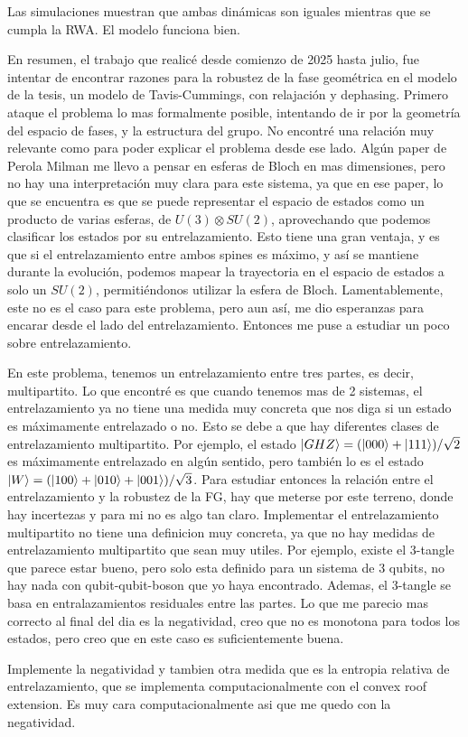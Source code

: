 Las simulaciones muestran que ambas dinámicas son iguales mientras que se cumpla la RWA. El modelo funciona bien.

En resumen, el trabajo que realicé desde comienzo de 2025 hasta julio, fue intentar de encontrar razones para la robustez de la fase geométrica en el modelo de la tesis, un modelo de Tavis-Cummings, con relajación y dephasing. Primero ataque el problema lo mas formalmente posible, intentando de ir por la geometría del espacio de fases, y la estructura del grupo. No encontré una relación muy relevante como para poder explicar el problema desde ese lado. Algún paper de Perola Milman me llevo a pensar en esferas de Bloch en mas dimensiones, pero no hay una interpretación muy clara para este sistema, ya que en ese paper, lo que se encuentra es que se puede representar el espacio de estados como un producto de varias esferas, de $U(3)\otimes SU(2)$, aprovechando que podemos clasificar los estados por su entrelazamiento. Esto tiene una gran ventaja, y es que si el entrelazamiento entre ambos spines es máximo, y así se mantiene durante la evolución, podemos mapear la trayectoria en el espacio de estados a solo un $SU(2)$, permitiéndonos utilizar la esfera de Bloch. Lamentablemente, este no es el caso para este problema, pero aun así, me dio esperanzas para encarar desde el lado del entrelazamiento. Entonces me puse a estudiar un poco sobre entrelazamiento. 

En este problema, tenemos un entrelazamiento entre tres partes, es decir, multipartito. Lo que encontré es que cuando tenemos mas de 2 sistemas, el entrelazamiento ya no tiene una medida muy concreta que nos diga si un estado es máximamente entrelazado o no. Esto se debe a que hay diferentes clases de entrelazamiento multipartito. Por ejemplo, el estado $\ket{GHZ}=(\ket{000}+\ket{111})/\sqrt{2}$ es máximamente entrelazado en algún sentido, pero también lo es el estado $\ket{W}=(\ket{100}+\ket{010}+\ket{001})/\sqrt{3}$. Para estudiar entonces la relación entre el entrelazamiento y la robustez de la FG, hay que meterse por este terreno, donde hay incertezas y para mi no es algo tan claro. Implementar el entrelazamiento multipartito no tiene una definicion muy concreta, ya que no hay medidas de entrelazamiento multipartito que sean muy utiles. Por ejemplo, existe el 3-tangle que parece estar bueno, pero solo esta definido para un sistema de 3 qubits, no hay nada con qubit-qubit-boson que yo haya encontrado. Ademas, el 3-tangle se basa en entralazamientos residuales entre las partes. Lo que me parecio mas correcto al final del dia es la negatividad, creo que no es monotona para todos los estados, pero creo que en este caso es suficientemente buena.

Implemente la negatividad y tambien otra medida que es la entropia relativa de entrelazamiento, que se implementa computacionalmente con el convex roof extension. Es muy cara computacionalmente asi que me quedo con la negatividad. 

